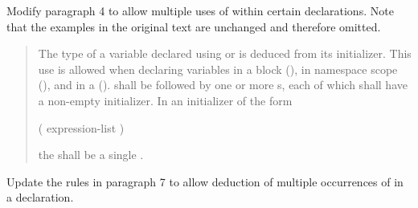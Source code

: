Modify paragraph 4 to allow multiple uses of  within
certain declarations. Note that the examples in the original text are 
unchanged and therefore omitted.

\begin{quote}
\pnum
The type of a variable declared using  or 
 is deduced from its initializer. 
% 
This use is allowed when declaring 
variables in a block (), 
in namespace scope (), and
in a  ().
%
%
  
shall be followed by one or more s,
each of which shall have a non-empty initializer.
%
In an initializer of the form
\begin{codeblock}
( expression-list )
\end{codeblock}
the  shall be a single 
.
\end{quote}

Update the rules in paragraph 7 to allow deduction of multiple occurrences 
of  in a declaration.

